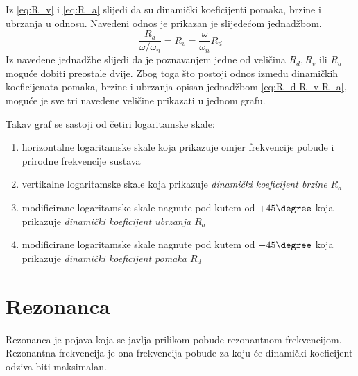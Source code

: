 
Iz \eqref{eq:R_v} i \eqref{eq:R_a} slijedi da su dinamički koeficijenti pomaka,
brzine i ubrzanja u odnosu. Navedeni odnos je prikazan je slijedećom jednadžbom.
\begin{equation}\label{eq:R_d-R_v-R_a}
    \frac{R_a}{\omega/\omega_n}=R_v=\frac{\omega}{\omega_n}R_d 
\end{equation}
Iz navedene jednadžbe slijedi da je poznavanjem jedne od veličina $R_d, R_v 
\text{ ili } R_a$ moguće dobiti preostale dvije. Zbog toga što postoji odnos
između dinamičkih koeficijenata pomaka, brzine i ubrzanja opisan jednadžbom 
\eqref{eq:R_d-R_v-R_a}, moguće je sve tri navedene veličine prikazati u jednom
grafu.

Takav graf se sastoji od četiri logaritamske skale:
\begin{enumerate}
    \item horizontalne logaritamske skale koja prikazuje omjer frekvencije pobude i 
        prirodne frekvencije sustava 
    \item vertikalne logaritamske skale koja prikazuje \textit{dinamički koeficijent brzine
        $R_d$}
    \item modificirane logaritamske skale nagnute pod kutem od $+45\degree$ koja prikazuje
        \textit{dinamički koeficijent ubrzanja $R_a$}
    \item modificirane logaritamske skale nagnute pod kutem od $-45\degree$ koja prikazuje
        \textit{dinamički koeficijent pomaka $R_d$}
\end{enumerate}


\section{Rezonanca}
Rezonanca je pojava koja se javlja prilikom pobude rezonantnom frekvencijom.
Rezonantna frekvencija je ona frekvencija pobude za koju će dinamički koeficijent
odziva biti maksimalan. 
\par

